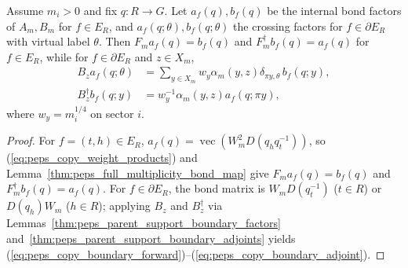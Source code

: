 \begin{lemma}%
    \label{thm:peps_copy_open_factors}
    \leanok
    Assume $m_i>0$ and fix $q:R\to G$. Let $a_f(q),b_f(q)$ be the internal bond factors of $A_m,B_m$ for $f\in E_R$, and $a_f(q;\theta),b_f(q;\theta)$ the crossing factors for $f\in\partial E_R$ with virtual label $\theta$. Then $F_ma_f(q)=b_f(q)$ and $F_m^\dagger b_f(q)=a_f(q)$ for $f\in E_R$, while for $f\in\partial E_R$ and $z\in X_m$,
    \begin{align}
        B_za_f(q;\theta)
         & =\sum_{y\in X_m}w_{y}\alpha_m(y,z)
        \delta_{\pi y,\theta}\,b_f(q;y),
        \label{eq:peps_copy_boundary_forward}  \\
        B_z^\dagger b_f(q;y)
         & =w_y^{-1}\alpha_m(y,z)a_f(q;\pi y),
        \label{eq:peps_copy_boundary_adjoint}
    \end{align}
    where $w_y=m_i^{1/4}$ on sector $i$.
\end{lemma}
\begin{proof}\leanok
    For $f=(t,h)\in E_R$, $a_f(q)=\operatorname{vec}(W_m^2D(q_hq_t^{-1}))$, so (\ref{eq:peps_copy_weight_products}) and Lemma~\ref{thm:peps_full_multiplicity_bond_map} give $F_ma_f(q)=b_f(q)$ and $F_m^\dagger b_f(q)=a_f(q)$. For $f\in\partial E_R$, the bond matrix is $W_mD(q_t^{-1})$ ($t\in R$) or $D(q_h)W_m$ ($h\in R$); applying $B_z$ and $B_z^\dagger$ via Lemmas~\ref{thm:peps_parent_support_boundary_factors} and~\ref{thm:peps_parent_support_boundary_adjoints} yields (\ref{eq:peps_copy_boundary_forward})--(\ref{eq:peps_copy_boundary_adjoint}).
\end{proof}

